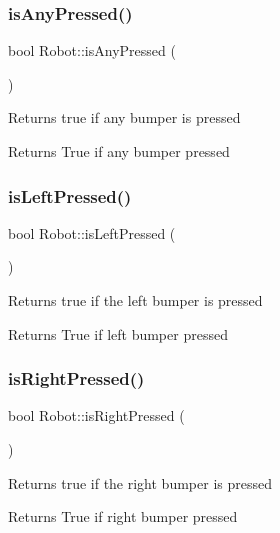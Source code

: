\subsubsection{\texorpdfstring{is\+Any\+Pressed()}{isAnyPressed()}}
{\footnotesize\ttfamily bool Robot\+::is\+Any\+Pressed (\begin{DoxyParamCaption}{ }\end{DoxyParamCaption})}

Returns true if any bumper is pressed \begin{DoxyReturn}{Returns}
True if any bumper pressed 
\end{DoxyReturn}
\mbox{\label{classRobot_a3b33d92fbb96a9dc1c1eb7e2b776be38}} 
\subsubsection{\texorpdfstring{is\+Left\+Pressed()}{isLeftPressed()}}
{\footnotesize\ttfamily bool Robot\+::is\+Left\+Pressed (\begin{DoxyParamCaption}{ }\end{DoxyParamCaption})}

Returns true if the left bumper is pressed \begin{DoxyReturn}{Returns}
True if left bumper pressed 
\end{DoxyReturn}
\mbox{\label{classRobot_acb4caaf0af89fd69fcc0396e79690a39}} 
\subsubsection{\texorpdfstring{is\+Right\+Pressed()}{isRightPressed()}}
{\footnotesize\ttfamily bool Robot\+::is\+Right\+Pressed (\begin{DoxyParamCaption}{ }\end{DoxyParamCaption})}

Returns true if the right bumper is pressed \begin{DoxyReturn}{Returns}
True if right bumper pressed 
\end{DoxyReturn}
\mbox{\label{classRobot_ac81ff2dbb90696fa4e538888e3e6e0f2}} 
